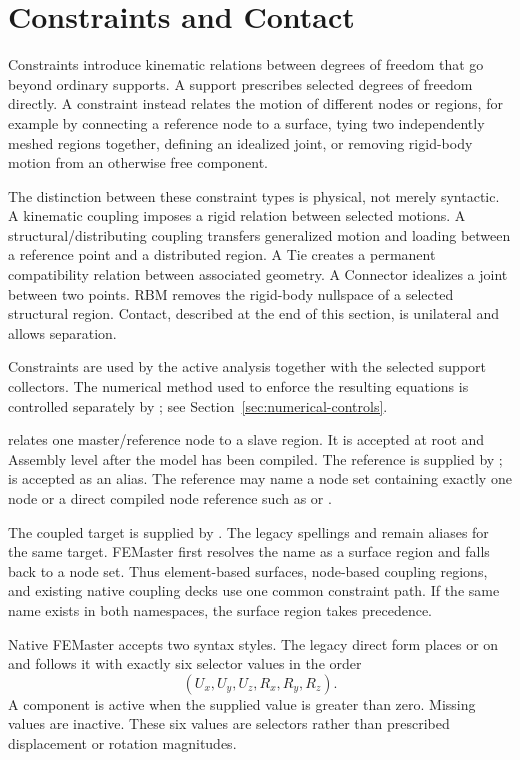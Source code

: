 \section{Constraints and Contact}
\label{sec:constraints}

Constraints introduce kinematic relations between degrees of freedom that go beyond ordinary supports. A support prescribes selected degrees of freedom directly. A constraint instead relates the motion of different nodes or regions, for example by connecting a reference node to a surface, tying two independently meshed regions together, defining an idealized joint, or removing rigid-body motion from an otherwise free component.

The distinction between these constraint types is physical, not merely syntactic. A kinematic coupling imposes a rigid relation between selected motions. A structural/distributing coupling transfers generalized motion and loading between a reference point and a distributed region. A Tie creates a permanent compatibility relation between associated geometry. A Connector idealizes a joint between two points. RBM removes the rigid-body nullspace of a selected structural region. Contact, described at the end of this section, is unilateral and allows separation.

Constraints are used by the active analysis together with the selected support collectors. The numerical method used to enforce the resulting equations is controlled separately by ; see Section~\ref{sec:numerical-controls}.


 relates one master/reference node to a slave region. It is accepted at root and Assembly level after the model has been compiled. The reference is supplied by ;  is accepted as an alias. The reference may name a node set containing exactly one node or a direct compiled node reference such as  or .

The coupled target is supplied by . The legacy spellings  and  remain aliases for the same target. FEMaster first resolves the name as a surface region and falls back to a node set. Thus element-based surfaces, node-based coupling regions, and existing native coupling decks use one common constraint path. If the same name exists in both namespaces, the surface region takes precedence.

Native FEMaster accepts two syntax styles. The legacy direct form places  or  on  and follows it with exactly six selector values in the order
\[
(U_x,U_y,U_z,R_x,R_y,R_z).
\]
A component is active when the supplied value is greater than zero. Missing values are inactive. These six values are selectors rather than prescribed displacement or rotation magnitudes.

